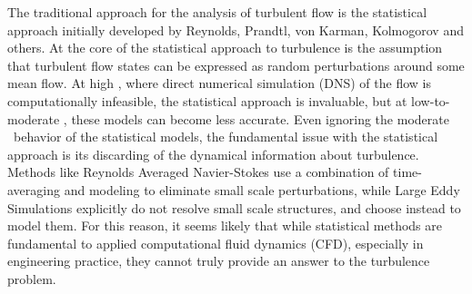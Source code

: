 The traditional approach for the analysis of turbulent flow is the statistical approach initially developed by Reynolds, Prandtl, von Karman, Kolmogorov and others. At the core of the statistical approach to turbulence is the assumption that turbulent flow states can be expressed as random perturbations around some mean flow. At high \ReN, where direct numerical simulation (DNS) of the flow is computationally infeasible, the statistical approach is invaluable, but at low-to-moderate \ReN, these models can become less accurate. Even ignoring the moderate \ReN\ behavior of the statistical models, the fundamental issue with the statistical approach is its discarding of the dynamical information about turbulence. Methods like Reynolds Averaged Navier-Stokes use a combination of time-averaging and modeling to eliminate small scale perturbations, while Large Eddy Simulations explicitly do not resolve small scale structures, and choose instead to model them. For this reason, it seems likely that while statistical methods are fundamental to applied computational fluid dynamics (CFD), especially in engineering practice, they cannot truly provide an answer to the turbulence problem. \\

